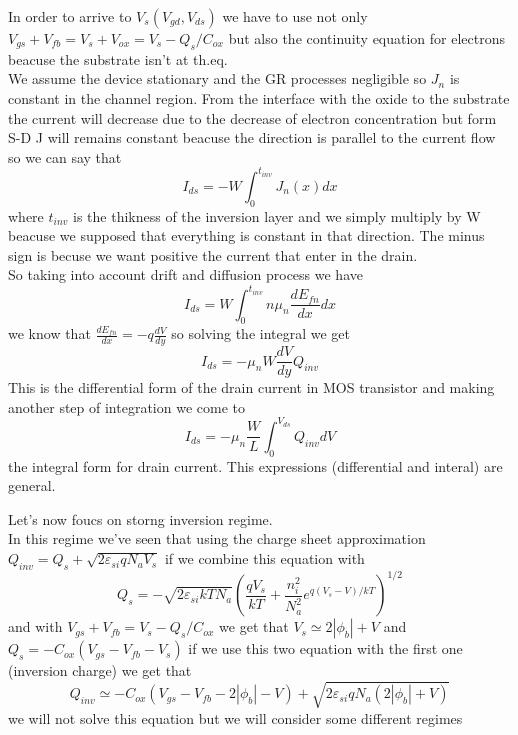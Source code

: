 In order to arrive to $V_s(V_{gd},V_{ds})$ we have to use not only $V_{gs}+V_{fb}=V_{s}+V_{ox}=V_{s}-Q_s/C_{ox}$ but also the continuity equation for electrons beacuse the substrate isn't at th.eq.\\
We assume the device stationary and the GR processes negligible so $J_n$ is constant in the channel region. From the interface with the oxide to the substrate the current will decrease due to the decrease of electron concentration but form S-D J will remains constant beacuse the direction is parallel to the current flow so we can say that
\begin{equation}
I_{ds}=-W\int^{t_{inv}}_0 J_n(x)dx
\end{equation}
where $t_{inv}$ is the thikness of the inversion layer and we simply multiply by W beacuse we supposed that everything is constant in that direction. The minus sign is becuse we want positive the current that enter in the drain.\\
So taking into account drift and diffusion process we have 
\begin{equation}
I_{ds}=W\int^{t_{inv}}_0 n\mu_n \frac{dE_{fn}}{dx} dx
\end{equation}
we know that $\frac{dE_{fn}}{dx}=-q \frac{dV}{dy}$ so solving the integral we get
\begin{equation}
I_{ds}=-\mu_nW \frac{dV}{dy}Q_{inv}
\end{equation}
This is the differential form of the drain current in MOS transistor and making another step of integration we come to 
\begin{equation}
I_{ds}=-\mu_n\frac{W}{L}\int^{V_{ds}}_0Q_{inv}dV
\end{equation}
the integral form for drain current. This expressions (differential and interal) are general.\\
\vspace{5mm}

Let's now foucs on storng inversion regime.\\
In this regime we've seen that using the charge sheet approximation $Q_{inv}=Q_s+\sqrt{2\varepsilon_{si}qN_aV_s}$ if we combine this equation with 
\begin{equation}
Q_s=-\sqrt{2\varepsilon_{si}kTN_a}\left(\frac{qV_s}{kT}+\frac{n_i^2}{N_a^2}e^{q(V_s-V)/kT}\right)^{1/2}
\end{equation}
 and with $V_{gs}+V_{fb}=V_{s}-Q_s/C_{ox}$ we get that $V_s\simeq2|\phi_b|+V$ and $Q_s=-C_{ox}(V_{gs}-V_{fb}-V_{s})$ if we use this two equation with the first one (inversion charge) we get that
\begin{equation}
Q_{inv}\simeq -C_{ox}(V_{gs}-V_{fb}-2|\phi_b|-V)+\sqrt{2\varepsilon_{si}qN_a(2|\phi_b|+V)}
\end{equation}
we will not solve this equation but we will consider some different regimes


